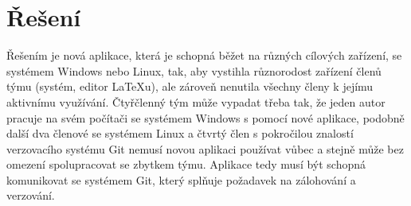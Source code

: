 \chapter{Řešení}
Řešením je nová aplikace, která je schopná běžet na různých cílových zařízení, se systémem Windows nebo Linux, tak, aby vystihla různorodost zařízení členů týmu (systém, editor LaTeXu), ale zároveň nenutila všechny členy k jejímu aktivnímu využívání. Čtyřčlenný tým může vypadat třeba tak, že jeden autor pracuje na svém počítači se systémem Windows s pomocí nové aplikace, podobně další dva členové se systémem Linux a čtvrtý člen s pokročilou znalostí verzovacího systému Git nemusí novou aplikaci používat vůbec a stejně může bez omezení spolupracovat se zbytkem týmu. Aplikace tedy musí být schopná komunikovat se systémem Git, který splňuje požadavek na zálohování a verzování.
